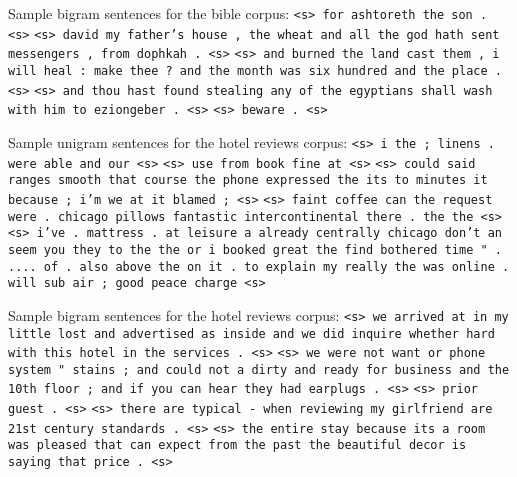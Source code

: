 \documentclass{article}
\begin{document}
Sample bigram sentences for the bible corpus:\npar
\texttt{<s> for ashtoreth the son . <s>}\npar
\texttt{<s> david my father's house , the wheat and all the god hath sent messengers , from dophkah . <s>}\npar
\texttt{<s> and burned the land cast them , i will heal : make thee ? and the month was six hundred and the place . <s>}\npar
\texttt{<s> and thou hast found stealing any of the egyptians shall wash with him to eziongeber . <s>}\npar
\texttt{<s> beware . <s>}\npar
\bigskip

Sample unigram sentences for the hotel reviews corpus:\npar
\texttt{<s> i the ; linens . were able and our <s>}\npar
\texttt{<s> use from book fine at <s>}\npar
\texttt{<s> could said ranges smooth that course the phone expressed the its to minutes it because ; i'm we at it blamed ; <s>}\npar
\texttt{<s> faint coffee can the request were . chicago pillows fantastic intercontinental there . the the <s>}\npar
\texttt{<s> i've . mattress . at leisure a already centrally chicago don't an seem you they to the the or i booked great the find bothered time " . .... of . also above the on it . to explain my really the was online . will sub air ; good peace charge <s>}\npar
\bigskip

Sample bigram sentences for the hotel reviews corpus:\npar
\texttt{<s> we arrived at in my little lost and advertised as inside and we did inquire whether hard with this hotel in the services . <s>}\npar
\texttt{<s> we were not want or phone system " stains ; and could not a dirty and ready for business and the 10th floor ; and if you can hear they had earplugs . <s>}\npar
\texttt{<s> prior guest . <s>}\npar
\texttt{<s> there are typical - when reviewing my girlfriend are 21st century standards . <s>}\npar
\texttt{<s> the entire stay because its a room was pleased that can expect from the past the beautiful decor is saying that price . <s>}\npar
\end{document}
